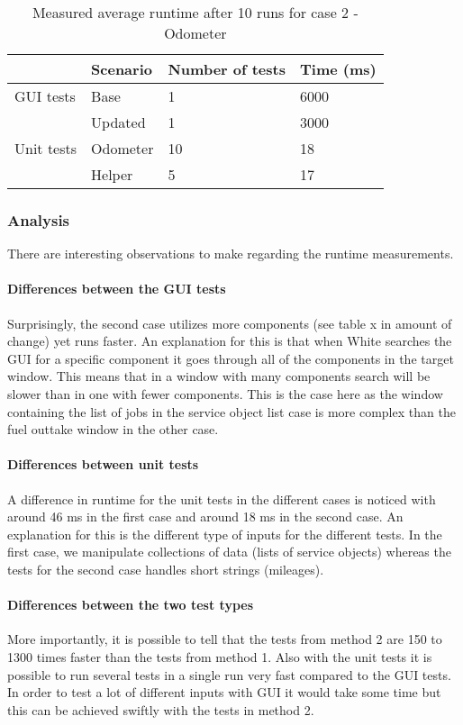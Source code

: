 \documentclass{article}
\begin{document}
			\begin{table}[h!]
				\begin{tabular}{l |l |l l}
				        & Scenario & Number of tests & Time (ms)\\
				\hline
				GUI tests & Base     & 1           & 6000 \\
				           & Updated  & 1    		& 3000 \\
				\hline
				Unit tests & Odometer & 10         & 18 \\
				 		& Helper      & 5           & 17 \\
				\end{tabular}
				\caption{Measured average runtime after 10 runs for case 2 - Odometer}
			\end{table}

			\subsubsection{Analysis}
			There are interesting observations to make regarding the runtime measurements. 

			\paragraph{Differences between the GUI tests}
			Surprisingly, the second case utilizes more components (see table x in amount of change) yet runs faster. An explanation for this is that when White searches the GUI for a specific component it goes through all of the components in the target window. This means that in a window with many components search will be slower than in one with fewer components. This is the case here as the window containing the list of jobs in the service object list case is more complex than the fuel
			outtake window in the other case.

			\paragraph{Differences between unit tests}
			A difference in runtime for the unit tests in the different cases is noticed with around 46 ms in the first case and around 18 ms in the second case. An explanation for this is the different type of inputs for the different tests. In the first case, we manipulate collections of data (lists of service objects) whereas the tests for the second case handles short strings (mileages).

			\paragraph{Differences between the two test types}			
			More importantly, it is possible to tell that the tests from method 2 are 150 to 1300 times faster than the tests from method 1. Also with the unit tests it is possible to run several tests in a single run very fast compared to the GUI tests. In order to test a lot of different inputs with GUI it would take some time but this can be achieved swiftly with the tests in method 2.
\end{document}

